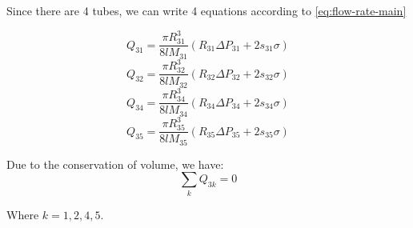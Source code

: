 	Since there are 4 tubes, we can write 4 equations according to \ref{eq:flow-rate-main}
	
	\[ Q_{31} = \frac{\pi R_{31}^3}{8lM_{31}}(R_{31}\Delta P_{31} + 2s_{31}\sigma) \]
	\[ Q_{32} = \frac{\pi R_{32}^3}{8lM_{32}}(R_{32}\Delta P_{32} + 2s_{32}\sigma) \]
	\[ Q_{34} = \frac{\pi R_{34}^3}{8lM_{34}}(R_{34}\Delta P_{34} + 2s_{34}\sigma) \]
	\[ Q_{35} = \frac{\pi R_{35}^3}{8lM_{35}}(R_{35}\Delta P_{35} + 2s_{35}\sigma) \]

	Due to the conservation of volume, we have:
	\[ \sum_{k} Q_{3k} = 0 \]
	
	Where $k = {1, 2, 4, 5}$.
